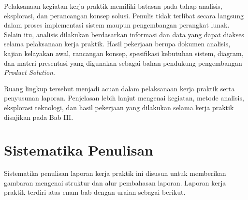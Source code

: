 Pelaksanaan kegiatan kerja praktik memiliki batasan pada tahap analisis, eksplorasi, dan perancangan konsep solusi. Penulis tidak terlibat secara langsung dalam proses implementasi sistem maupun pengembangan perangkat lunak. Selain itu, analisis dilakukan berdasarkan informasi dan data yang dapat diakses selama pelaksanaan kerja praktik. Hasil pekerjaan berupa dokumen analisis, kajian kelayakan awal, rancangan konsep, spesifikasi kebutuhan sistem, diagram, dan materi presentasi yang digunakan sebagai bahan pendukung pengembangan \textit{Product Solution}.

Ruang lingkup tersebut menjadi acuan dalam pelaksanaan kerja praktik serta penyusunan laporan. Penjelasan lebih lanjut mengenai kegiatan, metode analisis, eksplorasi teknologi, dan hasil pekerjaan yang dilakukan selama kerja praktik disajikan pada Bab III.

\section{Sistematika Penulisan}
Sistematika penulisan laporan kerja praktik ini disusun untuk memberikan gambaran mengenai struktur dan alur pembahasan laporan. Laporan kerja praktik terdiri atas enam bab dengan uraian sebagai berikut.

